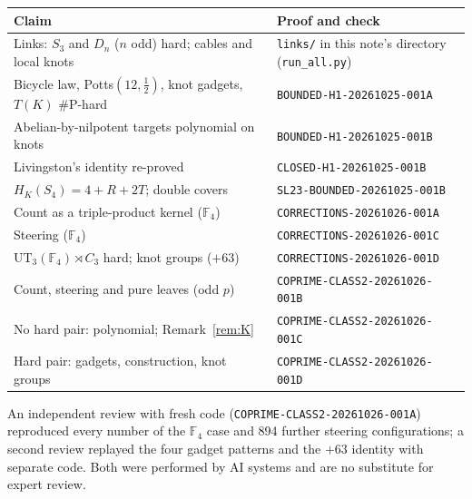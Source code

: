 \documentclass[11pt]{article}
\theoremstyle{definition}
\theoremstyle{remark}
\newcommand{\F}{\mathbb{F}}
\newcommand{\sharpP}{\#\mathrm{P}}
\begin{document}
\begin{center}
\begin{tabular}{@{}p{}p{}@{}}
\toprule
Claim & Proof and check\\
\midrule
Links: $S_3$ and $D_n$ ($n$ odd) hard; cables and local knots & \texttt{links/} in this note's directory (\texttt{run\_all.py})\\
Bicycle law, Potts$(12,\tfrac12)$, knot gadgets, $T(K)$ $\sharpP$-hard & \texttt{BOUNDED-H1-20261025-001A}\\
Abelian-by-nilpotent targets polynomial on knots & \texttt{BOUNDED-H1-20261025-001B}\\
Livingston's identity re-proved & \texttt{CLOSED-H1-20261025-001B}\\
$H_K(S_4)=4+R+2T$; double covers & \texttt{SL23-BOUNDED-20261025-001B}\\
Count as a triple-product kernel ($\F_4$) & \texttt{CORRECTIONS-20261026-001A}\\
Steering ($\F_4$) & \texttt{CORRECTIONS-20261026-001C}\\
$\mathrm{UT}_3(\F_4)\rtimes C_3$ hard; knot groups ($+63$) & \texttt{CORRECTIONS-20261026-001D}\\
Count, steering and pure leaves (odd $p$) & \texttt{COPRIME-CLASS2-20261026-001B}\\
No hard pair: polynomial; Remark~\ref{rem:K} & \texttt{COPRIME-CLASS2-20261026-001C}\\
Hard pair: gadgets, construction, knot groups & \texttt{COPRIME-CLASS2-20261026-001D}\\
\bottomrule
\end{tabular}
\end{center}

An independent review with fresh code (\texttt{COPRIME-CLASS2-20261026-001A})
reproduced every number of the $\F_4$ case and 894 further steering
configurations; a second review replayed the four gadget patterns and the
$+63$ identity with separate code. Both were performed by AI systems and are
no substitute for expert review.
\end{document}
